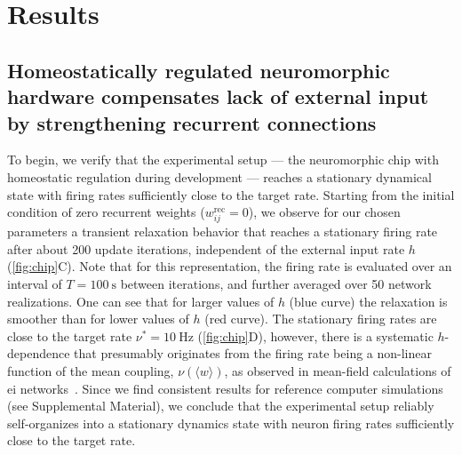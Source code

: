 \section{\label{sec:results}Results}

\subsection{Homeostatically regulated neuromorphic hardware compensates lack of external input by strengthening recurrent connections}

To begin, we verify that the experimental setup --- the neuromorphic chip with homeostatic regulation during development --- reaches a stationary dynamical state with firing rates sufficiently close to the target rate.
Starting from the initial condition of zero recurrent weights ($w^\mathrm{rec}_{ij}=0$), we observe for our chosen parameters a transient relaxation behavior that reaches a stationary firing rate after about \SI{200}{} update iterations, independent of the external input rate $h$ (\cref{fig:chip}C).
Note that for this representation, the firing rate is evaluated over an interval of $T=\SI{100}{\second}$ between iterations, and further averaged over \num{50} network realizations.
One can see that for larger values of $h$ (blue curve) the relaxation is smoother than for lower values of $h$ (red curve).
The stationary firing rates are close to the target rate $\nu^\ast=\SI{10}{\hertz}$ (\cref{fig:chip}D), however, there is a systematic $h$-dependence that presumably originates from the firing rate being a non-linear function of the mean coupling, $\nu(\langle w\rangle)$, as observed in mean-field calculations of \gls{ei} networks~\cite{mastrogiuseppe_intrinsically-generated_2017}. %
Since we find consistent results for reference computer simulations (see Supplemental Material), we conclude that the experimental setup reliably self-organizes into a stationary dynamics state with neuron firing rates sufficiently close to the target rate.

